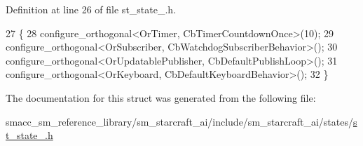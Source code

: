 Definition at line 26 of file st\+\_\+state\+\_.\+h.


\begin{DoxyCode}
27     \{
28         configure\_orthogonal<OrTimer, CbTimerCountdownOnce>(10);   
29         configure\_orthogonal<OrSubscriber, CbWatchdogSubscriberBehavior>();
30         configure\_orthogonal<OrUpdatablePublisher, CbDefaultPublishLoop>();
31         configure\_orthogonal<OrKeyboard, CbDefaultKeyboardBehavior>();
32     \}
\end{DoxyCode}


The documentation for this struct was generated from the following file\+:\begin{DoxyCompactItemize}
\item 
smacc\+\_\+sm\+\_\+reference\+\_\+library/sm\+\_\+starcraft\+\_\+ai/include/sm\+\_\+starcraft\+\_\+ai/states/\hyperlink{sm__starcraft__ai_2include_2sm__starcraft__ai_2states_2st__state__1_8h}{st\+\_\+state\+\_.\+h}\end{DoxyCompactItemize}
